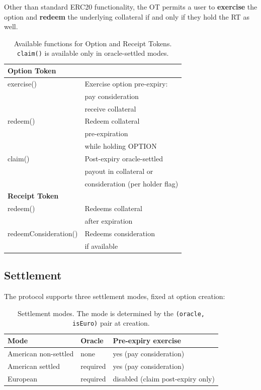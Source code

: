 \documentclass[%
 reprint,
 amsmath,amssymb,
 aps,
 prl,
floatfix,
]{revtex4-2}
\begin{document}
Other than standard ERC20 functionality, the OT permits a user to \textbf{exercise} the option and
\textbf{redeem} the underlying collateral if and only if they hold the RT as well.

\begin{table}[ht]
\centering
\begin{tabular}{|p{3.5cm} p{4cm}|}
\hline
\textbf{Option Token} & \\
\hline
exercise() & Exercise option pre-expiry: \\ &  pay consideration \\ & receive collateral \\
\hline
redeem() & Redeem collateral \\ & pre-expiration \\ & while holding OPTION \\
\hline
claim() & Post-expiry oracle-settled \\ & payout in collateral or \\ & consideration (per holder flag) \\
\hline
\textbf{Receipt Token} &  \\
\hline
redeem() & Redeems collateral \\ & after expiration \\
\hline
redeemConsideration() & Redeems consideration \\ & if available \\
\hline
\end{tabular}
\caption{Available functions for Option and Receipt Tokens. \texttt{claim()} is available only in oracle-settled modes.}
\label{tab:functions}
\end{table}


\subsection{Settlement}

The protocol supports three settlement modes, fixed at option creation:

\begin{table}[ht]
\centering
\begin{tabular}{|p{2.4cm} p{2.0cm} p{2.4cm}|}
\hline
\textbf{Mode} & \textbf{Oracle} & \textbf{Pre-expiry exercise} \\
\hline
American non-settled & none & yes (pay consideration) \\
\hline
American settled & required & yes (pay consideration) \\
\hline
European & required & disabled (claim post-expiry only) \\
\hline
\end{tabular}
\caption{Settlement modes. The mode is determined by the \texttt{(oracle, isEuro)} pair at creation.}
\label{tab:modes}
\end{table}
\end{document}
